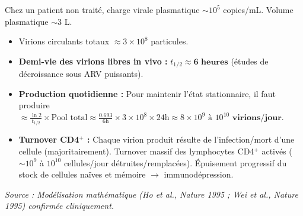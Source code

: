 \documentclass[11pt]{article}
\begin{document}
\begin{exemplebox}
Chez un patient non traité, charge virale plasmatique $\sim 10^5$ copies/mL. Volume plasmatique $\sim 3$ L.
\begin{itemize}
    \item Virions circulants totaux $\approx 3 \times 10^8$ particules.
    \item \textbf{Demi-vie des virions libres in vivo :} $t_{1/2} \approx \textbf{6 heures}$ (études de décroissance sous ARV puissants).
    \item \textbf{Production quotidienne :} Pour maintenir l'état stationnaire, il faut produire $\approx \frac{\ln 2}{t_{1/2}} \times \text{Pool total} \approx \frac{0.693}{6\text{h}} \times 3 \times 10^8 \times 24\text{h} \approx \textbf{$8 \times 10^9$ à $10^{10}$ virions/jour}$.
    \item \textbf{Turnover CD4$^+$ :} Chaque virion produit résulte de l'infection/mort d'une cellule (majoritairement). Turnover massif des lymphocytes CD4$^+$ activés ($\sim 10^9$ à $10^{10}$ cellules/jour détruites/remplacées). Épuisement progressif du stock de cellules naïves et mémoire $\to$ immunodépression.
\end{itemize}
\emph{Source : Modélisation mathématique (Ho et al., Nature 1995 ; Wei et al., Nature 1995) confirmée cliniquement.}
\end{exemplebox}
\end{document}
